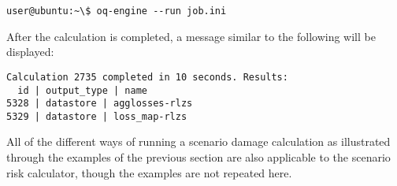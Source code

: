 \begin{verbatim}
user@ubuntu:~\$ oq-engine --run job.ini
\end{verbatim}

After the calculation is completed, a message similar to the following will be
displayed:

\begin{verbatim}
Calculation 2735 completed in 10 seconds. Results:
  id | output_type | name
5328 | datastore | agglosses-rlzs
5329 | datastore | loss_map-rlzs
\end{verbatim}

All of the different ways of running a scenario damage calculation as
illustrated through the examples of the previous section are also applicable
to the scenario risk calculator, though the examples are not repeated here.